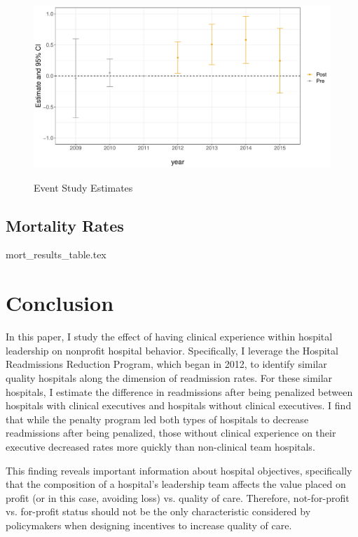 \documentclass[12pt]{article}
\begin{document}
    \begin{figure}[ht!]
        \caption{Event Study Estimates}
        \includegraphics[scale=.5]{Objects/read_es_graph.pdf}
        \label{fig:wa_eventstudy}
    \end{figure}

    \subsection{Mortality Rates}

    {mort_results_table.tex}

    \section{Conclusion}

    In this paper, I study the effect of having clinical experience within hospital leadership on nonprofit hospital behavior. Specifically, I leverage the Hospital Readmissions Reduction Program, which began in 2012, to identify similar quality hospitals along the dimension of readmission rates. For these similar hospitals, I estimate the difference in readmissions after being penalized between hospitals with clinical executives and hospitals without clinical executives. I find that while the penalty program led both types of hospitals to decrease readmissions after being penalized, those without clinical experience on their executive decreased rates more quickly than non-clinical team hospitals. 

    This finding reveals important information about hospital objectives, specifically that the composition of a hospital's leadership team affects the value placed on profit (or in this case, avoiding loss) vs. quality of care. Therefore, not-for-profit vs. for-profit status should not be the only characteristic considered by policymakers when designing incentives to increase quality of care. 
\end{document}
